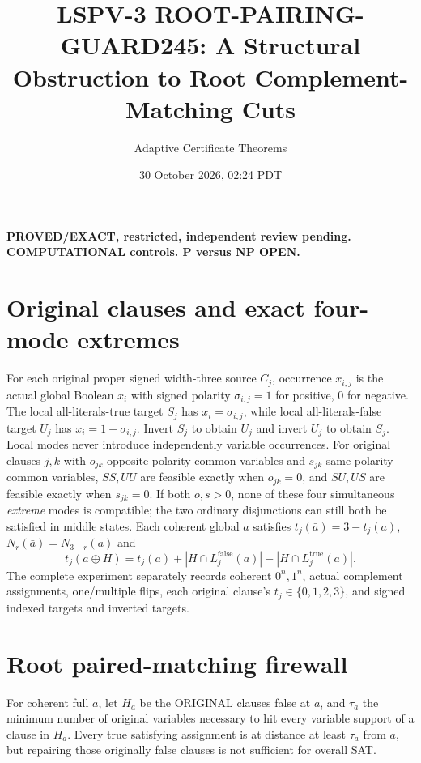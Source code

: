 \documentclass[10pt]{article}
\title{LSPV-3 ROOT-PAIRING-GUARD245: A Structural Obstruction to Root Complement-Matching Cuts}
\author{Adaptive Certificate Theorems}
\date{30 October 2026, 02:24 PDT}
\begin{document}
\maketitle
\noindent\textbf{PROVED/EXACT, restricted, independent review pending. COMPUTATIONAL controls. P versus NP OPEN.}
\section{Original clauses and exact four-mode extremes}
For each original proper signed width-three source $C_j$, occurrence $x_{i,j}$ is the actual global Boolean $x_i$ with signed polarity $\sigma_{i,j}=1$ for positive, 0 for negative. The local all-literals-true target $S_j$ has $x_i=\sigma_{i,j}$, while local all-literals-false target $U_j$ has $x_i=1-\sigma_{i,j}$. Invert $S_j$ to obtain $U_j$ and invert $U_j$ to obtain $S_j$. Local modes never introduce independently variable occurrences. For original clauses $j,k$ with $o_{jk}$ opposite-polarity common variables and $s_{jk}$ same-polarity common variables, $SS,UU$ are feasible exactly when $o_{jk}=0$, and $SU,US$ are feasible exactly when $s_{jk}=0$. If both $o,s>0$, none of these four simultaneous \emph{extreme} modes is compatible; the two ordinary disjunctions can still both be satisfied in middle states. Each coherent global $a$ satisfies $t_j(\bar a)=3-t_j(a)$, $N_r(\bar a)=N_{3-r}(a)$ and
\[
t_j(a\oplus H)=t_j(a)+|H\cap L_j^\mathrm{false}(a)|-|H\cap L_j^\mathrm{true}(a)|.
\]
The complete experiment separately records coherent $0^n,1^n$, actual complement assignments, one/multiple flips, each original clause's $t_j\in\{0,1,2,3\}$, and signed indexed targets and inverted targets.

\section{Root paired-matching firewall}
For coherent full $a$, let $H_a$ be the ORIGINAL clauses false at $a$, and $\tau_a$ the minimum number of original variables necessary to hit every variable support of a clause in $H_a$. Every true satisfying assignment is at distance at least $\tau_a$ from $a$, but repairing those originally false clauses is not sufficient for overall SAT.
\end{document}
